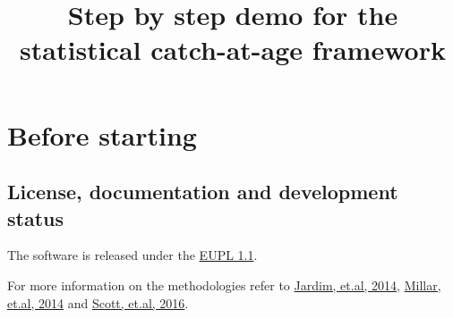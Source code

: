 \documentclass[a4paper,english,11pt]{article}\usepackage[]{graphicx}\usepackage[]{xcolor}
\begin{document}
\title{Step by step demo for the \aFa statistical catch-at-age framework}



\maketitle

\begin{abstract}
\end{abstract}

\newpage
\tableofcontents
\newpage



\section{Before starting}

\subsection{License, documentation and development status}

The software is released under the \href{https://joinup.ec.europa.eu/community/eupl/home}{EUPL 1.1}.

For more information on the \aFa methodologies refer to \href{http://icesjms.oxfordjournals.org/content/early/2014/04/03/icesjms.fsu050.abstract}{Jardim, et.al, 2014}, \href{http://icesjms.oxfordjournals.org/content/early/2014/03/31/icesjms.fsu043.abstract}{Millar, et.al, 2014} and \href{http://journals.plos.org/plosone/article?id=10.1371/journal.pone.0154922}{Scott, et.al, 2016}.
\end{document}
